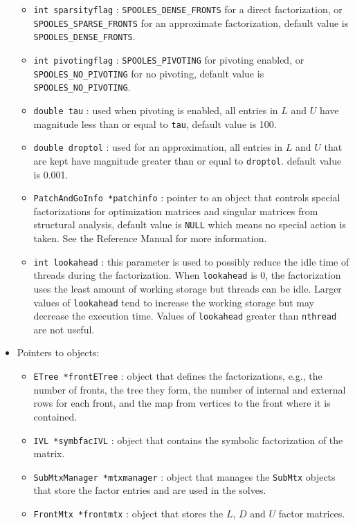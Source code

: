 \begin{itemize}
\begin{itemize}
\item
{\tt int sparsityflag} : 
{\tt SPOOLES\_DENSE\_FRONTS} for a direct factorization,
or {\tt SPOOLES\_SPARSE\_FRONTS} for an approximate factorization,
default value is {\tt SPOOLES\_DENSE\_FRONTS}.
\item
{\tt int pivotingflag} : 
{\tt SPOOLES\_PIVOTING} for pivoting enabled,
or {\tt SPOOLES\_NO\_PIVOTING} for no pivoting,
default value is {\tt SPOOLES\_NO\_PIVOTING}.
\item
{\tt double tau} : used when pivoting is enabled,
all entries in $L$ and $U$ have magnitude less than or equal to
\texttt{tau},
default value is 100.
\item
{\tt double droptol} : used for an approximation,
all entries in $L$ and $U$ that are kept 
have magnitude greater than or equal to \texttt{droptol}.
default value is 0.001.
\item
{\tt PatchAndGoInfo *patchinfo} : pointer to an object that
controls special factorizations for optimization matrices
and singular matrices from structural analysis,
default value is \texttt{NULL} which means no special action is taken.
See the Reference Manual for more information.
\item
{\tt int lookahead} : this parameter is used to possibly reduce the
idle time of threads during the factorization.
When {\tt lookahead} is 0, the factorization uses the least amount
of working storage but threads can be idle.
Larger values of {\tt lookahead} tend to increase the working
storage but may decrease the execution time.
Values of {\tt lookahead} greater than {\tt nthread} are not useful.
\end{itemize}
%
\item Pointers to objects:
\begin{itemize}
\item
{\tt ETree *frontETree} : object that defines the factorizations,
e.g., the number of fronts, the tree they form, the number of
internal and external rows for each front, and the map from
vertices to the front where it is contained.
\item
{\tt IVL *symbfacIVL} : object that contains the symbolic
factorization of the matrix.
\item
{\tt SubMtxManager *mtxmanager} : object that manages the
\texttt{SubMtx} objects that store the factor entries and are used
in the solves.
\item
{\tt FrontMtx *frontmtx} : object that stores the $L$, $D$ and $U$
factor matrices.

\end{itemize}
\end{itemize}
